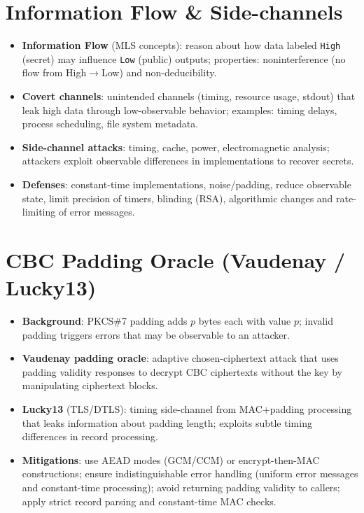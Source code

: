 \documentclass[11pt]{article}
\begin{document}
\section{Information Flow \& Side-channels}

\begin{itemize}
  \item \textbf{Information Flow} (MLS concepts): reason about how data labeled \texttt{High} (secret) may influence \texttt{Low} (public) outputs; properties: noninterference (no flow from High$\rightarrow$Low) and non-deducibility.
  
  \item \textbf{Covert channels}: unintended channels (timing, resource usage, stdout) that leak high data through low-observable behavior; examples: timing delays, process scheduling, file system metadata.
  
  \item \textbf{Side-channel attacks}: timing, cache, power, electromagnetic analysis; attackers exploit observable differences in implementations to recover secrets.
  
  \item \textbf{Defenses}: constant-time implementations, noise/padding, reduce observable state, limit precision of timers, blinding (RSA), algorithmic changes and rate-limiting of error messages.
\end{itemize}

\section{CBC Padding Oracle (Vaudenay / Lucky13)}

\begin{itemize}
  \item \textbf{Background}: PKCS\#7 padding adds $p$ bytes each with value $p$; invalid padding triggers errors that may be observable to an attacker.
  
  \item \textbf{Vaudenay padding oracle}: adaptive chosen-ciphertext attack that uses padding validity responses to decrypt CBC ciphertexts without the key by manipulating ciphertext blocks.
  
  \item \textbf{Lucky13} (TLS/DTLS): timing side-channel from MAC+padding processing that leaks information about padding length; exploits subtle timing differences in record processing.
  
  \item \textbf{Mitigations}: use AEAD modes (GCM/CCM) or encrypt-then-MAC constructions; ensure indistinguishable error handling (uniform error messages and constant-time processing); avoid returning padding validity to callers; apply strict record parsing and constant-time MAC checks.
\end{itemize}
\end{document}

